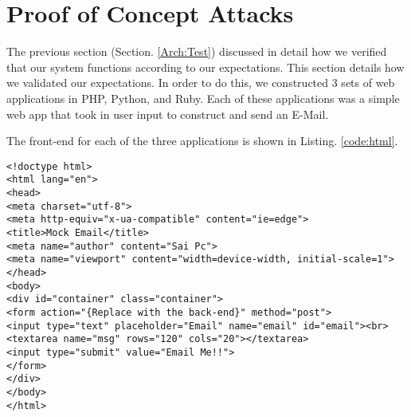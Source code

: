 \section{Proof of Concept Attacks}
The previous section (Section. \ref{Arch:Test}) discussed in detail how we verified that our system functions according to our expectations. This section details how we validated our expectations. In order to do this, we constructed 3 sets of web applications in PHP, Python, and Ruby. Each of these applications was a simple web app that took in user input to construct and send an E-Mail.

The front-end for each of the three applications is shown in Listing. \ref{code:html}.


\begin{lstlisting}
<!doctype html>
<html lang="en">
<head>
<meta charset="utf-8">
<meta http-equiv="x-ua-compatible" content="ie=edge">
<title>Mock Email</title>
<meta name="author" content="Sai Pc">
<meta name="viewport" content="width=device-width, initial-scale=1">
</head>
<body>
<div id="container" class="container">
<form action="{Replace with the back-end}" method="post">
<input type="text" placeholder="Email" name="email" id="email"><br>
<textarea name="msg" rows="120" cols="20"></textarea>
<input type="submit" value="Email Me!!">
</form>
</div>
</body>
</html>

\end{lstlisting}
